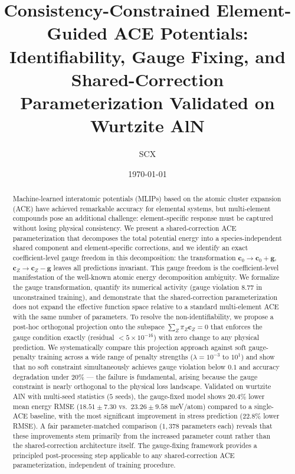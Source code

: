 \documentclass[twoside,prb,aps,floatfix,superscriptaddress,longbibliography]{revtex4-2}
\begin{document}
\title{Consistency-Constrained Element-Guided ACE Potentials: \\
Identifiability, Gauge Fixing, and Shared-Correction \\
Parameterization Validated on Wurtzite AlN}

\author{SCX}

\date{\today}

\begin{abstract}
Machine-learned interatomic potentials (MLIPs) based on the atomic cluster expansion (ACE) have achieved remarkable accuracy for elemental systems, but multi-element compounds pose an additional challenge: element-specific response must be captured without losing physical consistency. We present a shared-correction ACE parameterization that decomposes the total potential energy into a species-independent shared component and element-specific corrections, and we identify an exact coefficient-level gauge freedom in this decomposition: the transformation $\mathbf{c}_0 \to \mathbf{c}_0 + \mathbf{g}$, $\mathbf{c}_Z \to \mathbf{c}_Z - \mathbf{g}$ leaves all predictions invariant. This gauge freedom is the coefficient-level manifestation of the well-known atomic energy decomposition ambiguity. We formalize the gauge transformation, quantify its numerical activity (gauge violation $8.77$ in unconstrained training), and demonstrate that the shared-correction parameterization does not expand the effective function space relative to a standard multi-element ACE with the same number of parameters. To resolve the non-identifiability, we propose a post-hoc orthogonal projection onto the subspace $\sum_Z \pi_Z \mathbf{c}_Z = 0$ that enforces the gauge condition exactly (residual $< 5\times10^{-16}$) with zero change to any physical prediction. We systematically compare this projection approach against soft gauge-penalty training across a wide range of penalty strengths ($\lambda = 10^{-3}$ to $10^1$) and show that no soft constraint simultaneously achieves gauge violation below $0.1$ and accuracy degradation under $20\%$ --- the failure is fundamental, arising because the gauge constraint is nearly orthogonal to the physical loss landscape. Validated on wurtzite AlN with multi-seed statistics ($5$ seeds), the gauge-fixed model shows $20.4\%$ lower mean energy RMSE ($18.51 \pm 7.30$ vs.\ $23.26 \pm 9.58$ meV/atom) compared to a single-ACE baseline, with the most significant improvement in stress prediction ($22.8\%$ lower RMSE). A fair parameter-matched comparison ($1{,}378$ parameters each) reveals that these improvements stem primarily from the increased parameter count rather than the shared-correction architecture itself. The gauge-fixing framework provides a principled post-processing step applicable to any shared-correction ACE parameterization, independent of training procedure.
\end{abstract}
\end{document}
